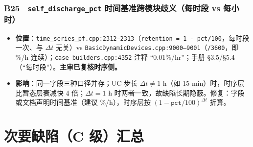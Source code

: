 \documentclass[11pt,a4paper,fontset=fandol]{ctexart}
\newcommand{\file}[1]{\texttt{#1}}
\begin{document}
\subsubsection*{B25　\texttt{self\_discharge\_pct} 时间基准跨模块歧义（每时段 vs 每小时）}
\begin{itemize}
  \item \textbf{位置}：\file{time\_series\_pf.cpp:2312--2313}（\texttt{retention = 1 - pct/100}，每时段一次、与 $\Delta t$ 无关）vs \file{BasicDynamicDevices.cpp:9000--9001}（\texttt{/3600}，即 \%/h 连续）；\file{case\_builders.cpp:4352} 注释 ``0.01\%/hr''；手册 \S 3.5/\S 5.4（``每时段''）。\textbf{主审已复核时序侧。}
  \item \textbf{影响}：同一字段三种口径并存；UC 步长 $\Delta t\neq 1$ h（如 15 min）时，时序层比暂态层衰减快 4 倍；$\Delta t=1$ h 时两者一致，故缺陷长期隐蔽。修复：字段或文档声明时间基准（建议 \%/h），时序层按 $(1-\texttt{pct}/100)^{\Delta t}$ 折算。
\end{itemize}

\newpage
\section{次要缺陷（C 级）汇总}
\label{sec:minor}
\end{document}
